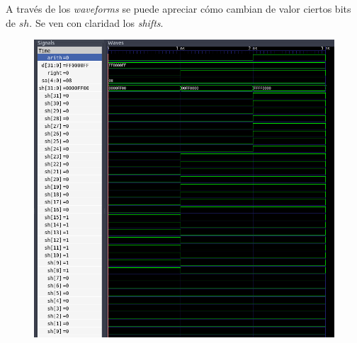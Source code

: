 \documentclass[11pt,a4paper]{article}
\begin{document}
\begin{enumerate}
A través de los \textit{waveforms} se puede apreciar cómo cambian de valor ciertos bits de $sh$. Se ven con claridad los \textit{shifts}. 
\begin{figure}[h!]
\centering
\includegraphics[scale=0.4]{barrelshifter_4.png} 
\end{figure}
\end{enumerate}
\end{document}
